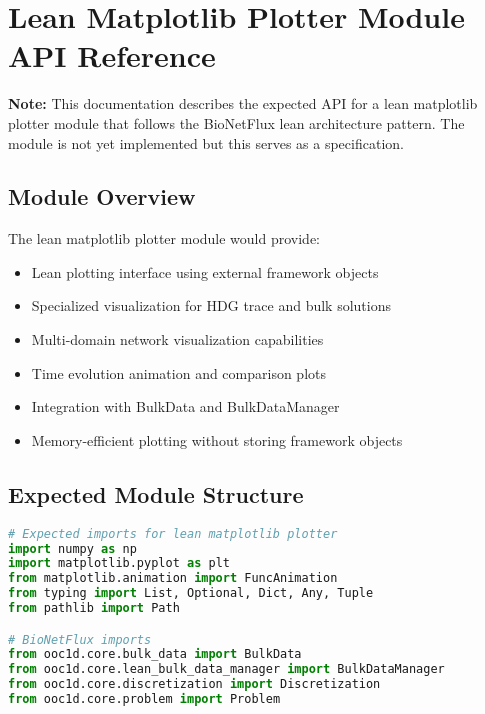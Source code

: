 %

\section{Lean Matplotlib Plotter Module API Reference}
\label{sec:lean_matplotlib_plotter_api}

\textbf{Note:} This documentation describes the expected API for a lean matplotlib plotter module that follows the BioNetFlux lean architecture pattern. The module is not yet implemented but this serves as a specification.

\subsection{Module Overview}

The lean matplotlib plotter module would provide:
\begin{itemize}
    \item Lean plotting interface using external framework objects
    \item Specialized visualization for HDG trace and bulk solutions
    \item Multi-domain network visualization capabilities
    \item Time evolution animation and comparison plots
    \item Integration with BulkData and BulkDataManager
    \item Memory-efficient plotting without storing framework objects
\end{itemize}

\subsection{Expected Module Structure}

\begin{lstlisting}[language=Python, caption=Expected Module Dependencies]
# Expected imports for lean matplotlib plotter
import numpy as np
import matplotlib.pyplot as plt
from matplotlib.animation import FuncAnimation
from typing import List, Optional, Dict, Any, Tuple
from pathlib import Path

# BioNetFlux imports
from ooc1d.core.bulk_data import BulkData
from ooc1d.core.lean_bulk_data_manager import BulkDataManager
from ooc1d.core.discretization import Discretization
from ooc1d.core.problem import Problem
\end{lstlisting}


